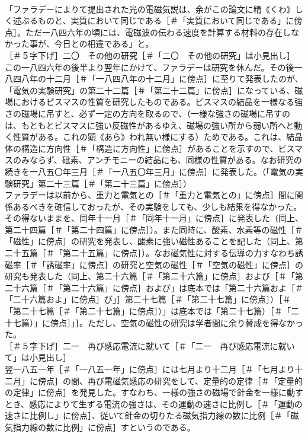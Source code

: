 \documentclass[8pt]{extreport}
\begin{document}
\begin{CJK}{UTF8}{min}
\\	「ファラデーによりて提出された光の電磁気説は、余がこの論文に精《くわ》しく述ぶるものと、実質において同じである［＃「実質において同じである」に傍点］。ただ一八四六年の頃には、電磁波の伝わる速度を計算する材料の存在しなかった事が、今日との相違である」と。
\\	［＃５字下げ］二〇　その他の研究［＃「二〇　その他の研究」は小見出し］
\\	この一八四六年の後半より翌年にかけて、ファラデーは研究を休んだ。その後一八四八年の十二月［＃「一八四八年の十二月」に傍点］に至りて発表したのが、「電気の実験研究」の第二十二篇［＃「第二十二篇」に傍点］になっている、磁場におけるビスマスの性質を研究したものである。ビスマスの結晶を一様なる強さの磁場に吊すと、必ず一定の方向を取るので、（一様な強さの磁場に吊すのは、もともとビスマスに強い反磁性があるゆえ、磁場の強い所から弱い所へと動く性質がある。これの顕《あら》われ無い様にする）ためである。これは、結晶体の構造に方向性［＃「構造に方向性」に傍点］があることを示すので、ビスマスのみならず、砒素、アンチモニーの結晶にも、同様の性質がある。なお研究の続きを一八五〇年三月［＃「一八五〇年三月」に傍点］に発表した。（「電気の実験研究」第二十三篇［＃「第二十三篇」に傍点］）
\\	ファラデーは以前から、重力と電気との［＃「重力と電気との」に傍点］間に関係あるべきを確信しておったが、その実験をしても、少しも結果を得なかった。その得ないままを、同年十一月［＃「同年十一月」に傍点］に発表した（同上、第二十四篇［＃「第二十四篇」に傍点］）。また同時に、酸素、水素等の磁性［＃「磁性」に傍点］の研究を発表し、酸素に強い磁性あることを記した（同上、第二十五篇［＃「第二十五篇」に傍点］）。なお磁気性に対する伝導の力すなわち誘磁率［＃「誘磁率」に傍点］の研究と空気の磁性［＃「空気の磁性」に傍点］の研究も発表した（同上、第二十六篇［＃「第二十六篇」に傍点］および［＃「第二十六篇［＃「第二十六篇」に傍点］および」は底本では「第二十六篇およ［＃「二十六篇およ」に傍点］び」］第二十七篇［＃「第二十七篇」に傍点］）［＃「第二十七篇［＃「第二十七篇」に傍点］）」は底本では「第二十七篇）［＃「二十七篇）」に傍点］」］。ただし、空気の磁性の研究は学者間に余り賛成を得なかった。
\\	［＃５字下げ］二一　再び感応電流に就いて［＃「二一　再び感応電流に就いて」は小見出し］
\\	翌一八五一年［＃「一八五一年」に傍点］には七月より十二月［＃「七月より十二月」に傍点］の間、再び電磁気感応の研究をして、定量的の定律［＃「定量的の定律」に傍点］を発見した。すなわち、一様の強さの磁場で針金を一様に動すとき、感応によりて生ずる電流の強さは、その運動の速さに比例し［＃「運動の速さに比例し」に傍点］、従いて針金の切りたる磁気指力線の数に比例［＃「磁気指力線の数に比例」に傍点］すというのである。

\end{CJK}
\end{document}

